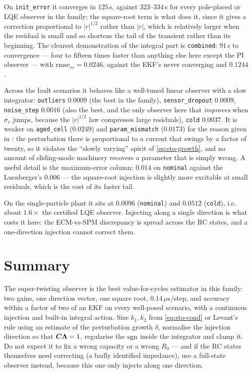On \texttt{init\_error} it converges in $125$\,s, against $323$--$334$\,s for every
pole-placed or LQE observer in the family; the square-root term is what does it, since it gives a
correction proportional to $|r|^{1/2}$ rather than $|r|$, which is relatively larger when the
residual is small and so shortens the tail of the transient rather than its beginning.  The
clearest demonstration of the integral part is \texttt{combined}: $91$\,s to convergence --- four
to fifteen times faster than anything else here except the PI observer --- with
$\mathrm{rmse}_{ss}=0.0246$, against the EKF's never converging and $0.1244$.

Across the fault scenarios it behaves like a well-tuned linear observer with a slow integrator:
\texttt{outliers} $0.0009$ (the best in the family), \texttt{sensor\_dropout} $0.0009$,
\texttt{noise\_step} $0.0016$ (also the best, and the only observer here that \emph{improves} when
$\sigma_v$ jumps, because the $|r|^{1/2}$ law compresses large residuals), \texttt{cold} $0.0037$.
It is weaker on \texttt{aged\_cell} ($0.0249$) and \texttt{param\_mismatch} ($0.0173$) for the
reason given in : the perturbation there is proportional to a current that swings by
a factor of twenty, so it violates the ``slowly varying'' spirit of \eqref{eq:sto-growth}, and no
amount of sliding-mode machinery recovers a parameter that is simply wrong.  A useful detail is
the maximum-error column: $0.014$ on \texttt{nominal} against the Luenberger's $0.006$ --- the
square-root injection is slightly more excitable at small residuals, which is the cost of its
faster tail.

On the single-particle plant it sits at $0.0096$ (\texttt{nominal}) and $0.0512$ (\texttt{cold}),
i.e. about $1.6\times$ the certified LQE observer.  Injecting along a single direction is what
costs it here: the ECM-vs-SPM discrepancy is spread across the RC states, and a one-direction
injection cannot correct them.

\section{Summary}
The super-twisting observer is the best value-for-cycles estimator in this family: two gains, one
direction vector, one square root, $0.14\,\mu$s/step, and accuracy within a factor of two
of an EKF on every well-posed scenario, with a continuous injection and built-in integral action.
Size $k_1,k_2$ from \eqref{eq:sto-cond} or Levant's rule using an estimate of the perturbation
growth $\delta$, normalise the injection direction so that $\bm{C}\bm{\Lambda}=1$, regularise the
$\operatorname{sgn}$ inside the integrator and clamp it.  Do not expect it to fix a wrong capacity or a wrong
$R_0$ --- and if the RC states themselves need correcting (a badly identified impedance), use a
full-state observer instead, because this one only injects along one direction.
